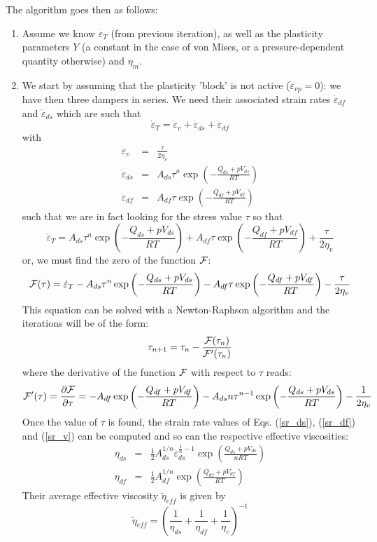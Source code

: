 \begin{itemize}
The algorithm goes then as follows:
\begin{enumerate}
\item Assume we know $\dot\varepsilon_T$ (from previous iteration), 
as well as the plasticity parameters $Y$ (a constant in the case of von Mises, or a pressure-dependent 
quantity otherwise) and $\eta_m$.
\item We start by assuming that the plasticity 'block' is not active ($\dot{\varepsilon}_{vp}=0$): we have then three dampers in series. 
We need their associated strain rates 
$\dot{\varepsilon}_{df}$ and $\dot{\varepsilon}_{ds}$ which are such that 
\[
\dot\varepsilon_T = 
\dot\varepsilon_v + \dot\varepsilon_{ds} + \dot\varepsilon_{df} 
\]
with
\begin{eqnarray}
\dot\varepsilon_v &=& \frac{\tau}{2 \eta_v} \label{sr_v} \\
\dot\varepsilon_{ds}  &=& A_{ds} \tau^n \exp \left(-\frac{Q_{ds}+pV_{ds}}{RT}\right) \label{sr_ds} \\
\dot\varepsilon_{df}  &=& A_{df} \tau   \exp \left(-\frac{Q_{df}+pV_{df}}{RT}\right) \label{sr_df} 
\end{eqnarray}
such that we are in fact looking for the stress value $\tau$ so that 
\[
\dot\varepsilon_T = 
A_{ds} \tau^n \exp \left(-\frac{Q_{ds}+p V_{ds}}{RT}\right) 
+
A_{df} \tau   \exp \left(-\frac{Q_{df}+p V_{df}}{RT}\right) 
+
\frac{\tau}{2 \eta_v}
\]
or, we must find the zero of the function ${\cal F}$: 
\[
{\cal F}(\tau) = 
\dot\varepsilon_T 
- A_{ds} \tau^n \exp \left(-\frac{Q_{ds}+p V_{ds}}{RT}\right) 
- A_{df} \tau   \exp \left(-\frac{Q_{df}+p V_{df}}{RT}\right) 
- \frac{\tau}{2 \eta_v} 
\]
This equation can be solved with a Newton-Raphson algorithm
and the iterations will be of the form:
\[
\tau_{n+1} = \tau_n - \frac{{\cal F}(\tau_n)}{{\cal F}'(\tau_n)}
\]
where the derivative of the function ${\cal F}$ with respect to $\tau$ reads:
\[
{\cal F}'(\tau)=\frac{\partial {\cal F}}{\partial \tau}=
- A_{df} \exp\left(-\frac{Q_{df}+pV_{df}}{RT}\right) 
- A_{ds} n \tau^{n-1} \exp\left(-\frac{Q_{ds}+pV_{ds}}{RT}\right)
- \frac{1}{2\eta_v}
\]
Once the value of $\tau$ is found, 
the strain rate values of Eqs. (\ref{sr_ds}), (\ref{sr_df}) and (\ref{sr_v}) 
can be computed and so can the respective effective viscosities:
\begin{eqnarray}
\eta_{ds} 
&=& \frac{1}{2} A_{ds}^{1/n} \dot\varepsilon_{ds}^{\frac{1}{n}-1} \exp \left(\frac{Q_{ds}+pV_{ds}}{nRT}\right) \\
\eta_{df} 
&=& \frac{1}{2} A_{df}^{1/n}  \exp \left(\frac{Q_{df}+pV_{df}}{RT}\right) 
\end{eqnarray}
Their average effective viscosity $\tilde{\eta}_{eff}$ is given by 
\[
\tilde{\eta}_{eff} = \left( \frac{1}{\eta_{ds}} + \frac{1}{\eta_{df}} + \frac{1}{\eta_v} \right)^{-1}
\]



\end{enumerate}
\end{itemize}
